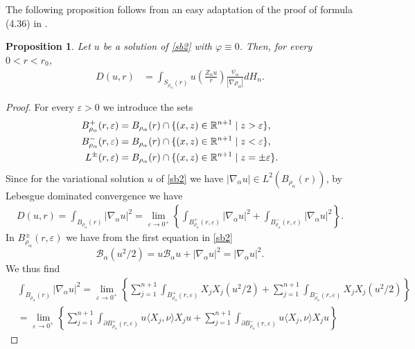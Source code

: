 \documentclass[11pt]{amsart}
\theoremstyle{plain}
\newtheorem{prop}[thrm]{Proposition}
\numberwithin{equation}{section}
\begin{document}
The following proposition follows from an easy adaptation of the proof of formula (4.36) in \cite{G}.
\begin{prop}\label{P:diri}
 Let $u$ be a solution of \eqref{sb2} with ${\varphi}\equiv 0$. Then, for every $0<r<r_0$,
 \begin{align}\label{Ds}
  D(u,r)&=\int_{S_{\rho_\alpha}(r)}u\left(\frac{Z_\alpha u}{r}\right)\frac{\psi_\alpha}{|\nabla {\rho_\alpha}|}dH_{n}.
 \end{align}
\end{prop}

\begin{proof}
For every ${\varepsilon} >0$ we introduce the sets
\begin{align}\label{es}
B^+_{\rho_\alpha}(r,{\varepsilon}) & = B_{\rho_\alpha}(r) \cap \{(x,z)\in {\mathbb R}^{n+1}\mid z>{\varepsilon}\},
\\
B^-_{\rho_\alpha}(r,{\varepsilon}) & = B_{\rho_\alpha}(r) \cap \{(x,z)\in {\mathbb R}^{n+1}\mid z<{\varepsilon}\},
\notag\\
L^{\pm}(r,{\varepsilon}) & = B_{\rho_\alpha}(r) \cap \{(x,z)\in {\mathbb R}^{n+1}\mid z = \pm {\varepsilon}\}.
\notag
\end{align}
Since for the variational solution $u$ of \eqref{sb2} we have $|{\nabla_\alpha} u|\in L^2(B_{\rho_\alpha}(r))$, by Lebesgue dominated convergence we have
\begin{align*}
D(u,r) = \int_{{B_{\rho_\alpha}(r)}} |{\nabla_\alpha} u|^2   = \underset{{\varepsilon}\to 0^+}{\lim} \left\{\int_{{B^+_{\rho_\alpha}(r,{\varepsilon})}} |{\nabla_\alpha} u|^2 +  \int_{{B^-_{\rho_\alpha}(r,{\varepsilon})}} |{\nabla_\alpha} u|^2 \right\}.
\end{align*}
In $B^\pm_{\rho_\alpha}(r,{\varepsilon})$ we have from the first equation in \eqref{sb2}
\[
{\mathcal{B}_\alpha}(u^2/2) = u {\mathcal{B}_\alpha} u + |{\nabla_\alpha} u|^2 = |{\nabla_\alpha} u|^2.
\]
We thus find
\begin{align*}
& \int_{{B_{\rho_\alpha}(r)}} |{\nabla_\alpha} u|^2  = \underset{{\varepsilon}\to 0^+}{\lim} \left\{\sum_{j=1}^{n+1} \int_{{B^+_{\rho_\alpha}(r,{\varepsilon})}} X_j X_j (u^2/2) + \sum_{j=1}^{n+1}  \int_{{B^-_{\rho_\alpha}(r,{\varepsilon})}} X_j X_j (u^2/2) \right\}
\\
& = \underset{{\varepsilon}\to 0^+}{\lim} \left\{\sum_{j=1}^{n+1} \int_{{{\partial} B^+_{\rho_\alpha}(r,{\varepsilon})}} u \langle X_j,\nu\rangle  X_j u + \sum_{j=1}^{n+1}  \int_{{{\partial} B^-_{\rho_\alpha}(r,{\varepsilon})}} u \langle X_j,\nu\rangle  X_j u  \right\}

\end{align*}
\end{proof}
\end{document}
